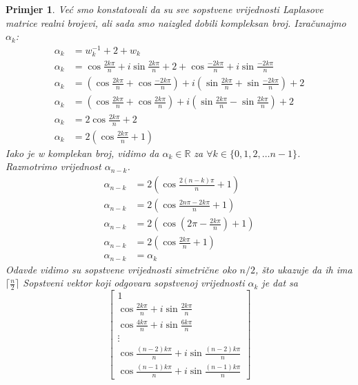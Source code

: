 \documentclass[11pt]{article}
\newtheorem{example}{Primjer}
\begin{document}
\begin{example}
	Već smo konstatovali da su sve sopstvene vrijednosti Laplasove matrice realni brojevi, ali sada smo naizgled dobili kompleksan broj. 
	Izračunajmo $\alpha_k$:
	\[
	\begin{split}
		\alpha_k & = w_k^{-1} + 2 + w_k \\
		\alpha_k & = \cos \frac{2 k \pi}{n} + i \sin \frac{2 k \pi}{n} + 2 + \cos \frac{-2 k \pi}{n} + i \sin \frac{-2 k \pi}{n} \\
		\alpha_k & = (\cos \frac{2 k \pi}{n} + \cos \frac{-2 k \pi}{n}) + i(\sin \frac{2 k \pi}{n} + \sin \frac{-2 k \pi}{n}) + 2 \\
		\alpha_k & = (\cos \frac{2 k \pi}{n} + \cos \frac{2 k \pi}{n}) + i(\sin \frac{2 k \pi}{n} - \sin \frac{2 k \pi}{n}) + 2 \\
		\alpha_k & = 2\cos \frac{2 k \pi}{n} + 2 \\
		\alpha_k & = 2 (\cos \frac{2 k \pi}{n} + 1)
	\end{split}
	\]
	Iako je w komplekan broj, vidimo da $\alpha_k \in \mathbb{R}$ za $\forall k \in \{0,1,2, \dots n-1\}$.
	Razmotrimo vrijednost $\alpha_{n-k}$.
	\[
	\begin{split}
		\alpha_{n-k} & = 2 (\cos \frac{2 (n-k) \pi}{n} + 1) \\
		\alpha_{n-k} & = 2 (\cos \frac{2n\pi - 2k\pi}{n} + 1) \\
		\alpha_{n-k} & = 2 (\cos ( 2\pi - \frac{2k\pi}{n}) + 1) \\
		\alpha_{n-k} & = 2 (\cos \frac{2k\pi}{n} + 1) \\ 
		\alpha_{n-k} & = \alpha_k 
	\end{split}
	\]
	Odavde vidimo su sopstvene vrijednosti simetrične oko $n/2$, što ukazuje da ih ima $\lceil \frac{n}{2}\rceil$ 
	Sopstveni vektor koji odgovara sopstvenoj vrijednosti $\alpha_k$ je dat sa 
	\[
	\begin{bmatrix}
	1 \\
	\cos \frac{2 k \pi}{n} + i \sin \frac{2 k \pi}{n} \\
	\cos \frac{4 k \pi}{n} + i \sin \frac{6 k \pi}{n} \\
	\vdots \\
	\cos \frac{(n-2) k \pi}{n} + i \sin \frac{(n-2) k \pi}{n} \\
	\cos \frac{(n-1) k \pi}{n} + i \sin \frac{(n-1) k \pi}{n} 
	\end{bmatrix}
	\]

	\end{example}
\end{document}
